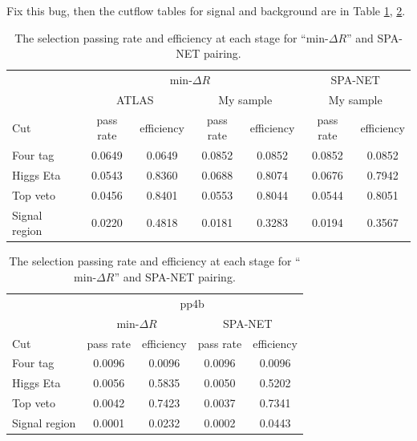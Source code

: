 \documentclass[12pt]{article}
\begin{document}
	Fix this bug, then the cutflow tables for signal and background are in Table \ref{tab:signal_selection_efficiency_SPANet_correct}, \ref{tab:signal_selection_efficiency_background_SPANet_correct}.
	\begin{table}[htpb]
			\centering
			\caption{The selection passing rate and efficiency at each stage for ``$\text{min-}\Delta R$'' and SPA-NET pairing.}
			\label{tab:signal_selection_efficiency_SPANet_correct}
			\begin{tabular}{l|cc|cc|cc}
					& \multicolumn{4}{c|}{$\text{min-}\Delta R$}                               & \multicolumn{2}{c}{SPA-NET}   \\
							  & \multicolumn{2}{c|}{ATLAS} & \multicolumn{2}{c|}{My sample}             & \multicolumn{2}{c}{My sample} \\
				Cut           & pass rate   & efficiency  & pass rate & \multicolumn{1}{c|}{efficiency} & pass rate     & efficiency    \\ \hline
				Four tag      & 0.0649 & 0.0649 & 0.0852 & 0.0852 & 0.0852 & 0.0852\\
				Higgs Eta     & 0.0543 & 0.8360 & 0.0688 & 0.8074 & 0.0676 & 0.7942\\
				Top veto      & 0.0456 & 0.8401 & 0.0553 & 0.8044 & 0.0544 & 0.8051\\
				Signal region & 0.0220 & 0.4818 & 0.0181 & 0.3283 & 0.0194 & 0.3567\\
			\end{tabular}
		\end{table}
		\begin{table}[htpb]
			\centering
			\caption{The selection passing rate and efficiency at each stage for ``$\text{min-}\Delta R$'' and SPA-NET pairing. }
			\label{tab:signal_selection_efficiency_background_SPANet_correct}
			\begin{tabular}{l|cc|cc}
							  & \multicolumn{4}{c}{pp4b}                                                         \\
							  & \multicolumn{2}{c|}{$\text{min-}\Delta R$}& \multicolumn{2}{c}{SPA-NET} \\
				Cut           & pass rate               & efficiency                & pass rate    & efficiency   \\ \hline
				Four tag      & 0.0096                  & 0.0096                    & 0.0096       & 0.0096       \\
				Higgs Eta     & 0.0056                  & 0.5835                    & 0.0050       & 0.5202       \\
				Top veto      & 0.0042                  & 0.7423                    & 0.0037       & 0.7341      \\
				Signal region & 0.0001                  & 0.0232                    & 0.0002       & 0.0443       \\
			\end{tabular}
		\end{table}
\end{document}
